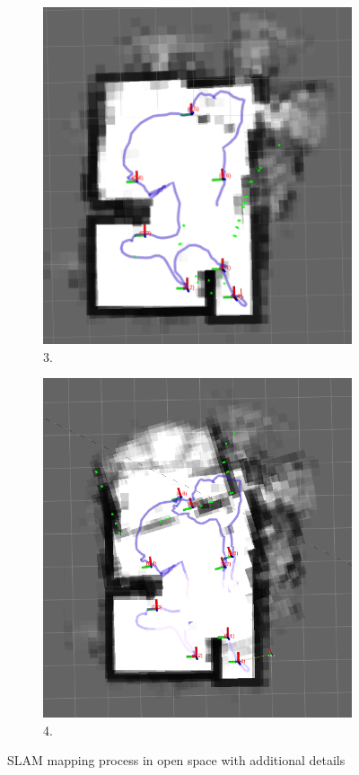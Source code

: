\begin{figure}[ht!]
\begin{subfigure}[b]{0.4\linewidth}
      \includegraphics[width=0.9\linewidth]{figures/building2_open_03.png}
      \caption{3.}
    \end{subfigure}
    \begin{subfigure}[b]{0.4\linewidth}
      \includegraphics[width=0.9\linewidth]{figures/building2_open_04.png}
      \caption{4.}
    \end{subfigure}
    \caption{SLAM mapping process in open space with additional details}
    \label{fig:slam_in_open_space}
\end{figure}












